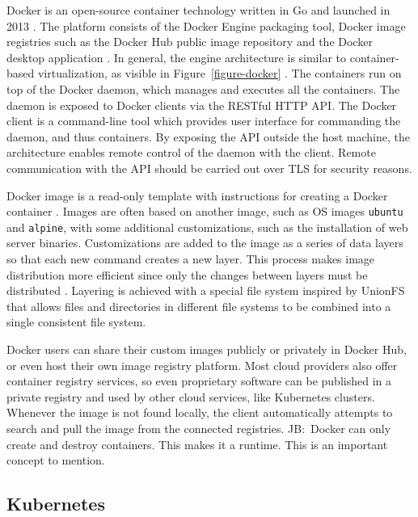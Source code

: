 \documentclass[english, 12pt, a4paper, sci, utf8, a-2b, online]{aaltothesis}
\newcommand{\mycomment}[3]{\textcolor{#1}{#2:~#3}}
\newcommand{\jb}[1]{\noindent\mycomment{aaltoRed}{JB}{#1}}
\begin{document}
Docker is an open-source container technology written in Go and launched in 2013 \cite[text]{docker-what}.
The platform consists of the Docker Engine packaging tool, Docker image registries such as the Docker Hub public image repository and the Docker desktop application \cite{docker-overview}.
In general, the engine architecture is similar to container-based virtualization, as visible in Figure~\ref{figure-docker} \cite{bui2015analysis}.
The containers run on top of the Docker daemon, which manages and executes all the containers.
The daemon is exposed to Docker clients via the RESTful HTTP API.
The Docker client is a command-line tool which provides user interface for commanding the daemon, and thus containers.
By exposing the API outside the host machine, the architecture enables remote control of the daemon with the client.
Remote communication with the API should be carried out over TLS for security reasons.

Docker image is a read-only template with instructions for creating a Docker container \cite{docker-overview}.
Images are often based on another image, such as OS images \texttt{ubuntu} and \texttt{alpine}, with some additional customizations, such as the installation of web server binaries.
Customizations are added to the image as a series of data layers so that each new command creates a new layer.
This process makes image distribution more efficient since only the changes between layers must be distributed \cite{bui2015analysis}.
Layering is achieved with a special file system inspired by UnionFS that allows files and directories in different file systems to be combined into a single consistent file system.

Docker users can share their custom images publicly or privately in Docker Hub, or even host their own image registry platform.
Most cloud providers also offer container registry services, so even proprietary software can be published in a private registry and used by other cloud services, like Kubernetes clusters.
Whenever the image is not found locally, the client automatically attempts to search and pull the image from the connected registries.
\jb{Docker can only create and destroy containers.
This makes it a runtime.
This is an important concept to mention.}

\subsection{Kubernetes}
\end{document}
